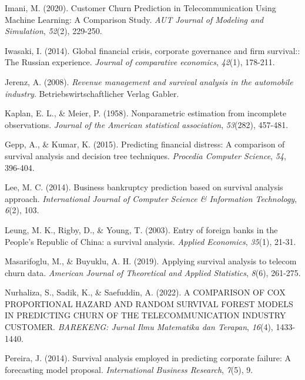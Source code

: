 \documentclass[doublespacing,12pt]{report}
\begin{document}
{\begin{enumerate}[label=\textbf{[\arabic*]}]
    \item Imani, M. (2020). Customer Churn Prediction in Telecommunication Using Machine Learning: A Comparison Study. \textit{AUT Journal of Modeling and Simulation}, \textit{52}(2), 229-250. 
    
    \item Iwasaki, I. (2014). Global financial crisis, corporate governance and firm survival:: The Russian experience. \textit{Journal of comparative economics}, \textit{42}(1), 178-211. 

    \item Jerenz, A. (2008). \textit{Revenue management and survival analysis in the automobile industry}. Betriebswirtschaftlicher Verlag Gabler. 
    
    \item Kaplan, E. L., \& Meier, P. (1958). Nonparametric estimation from incomplete observations. \textit{Journal of the American statistical association}, \textit{53}(282), 457-481. 


    
    \item Gepp, A., \& Kumar, K. (2015). Predicting financial distress: A comparison of survival analysis and decision tree techniques. \textit{Procedia Computer Science}, \textit{54}, 396-404. 
    

    
    \item Lee, M. C. (2014). Business bankruptcy prediction based on survival analysis approach. \textit{International Journal of Computer Science \& Information Technology}, \textit{6}(2), 103. 
    \item Leung, M. K., Rigby, D., \& Young, T. (2003). Entry of foreign banks in the People's Republic of China: a survival analysis. \textit{Applied Economics}, \textit{35}(1), 21-31. 
    
    \item Masarifoglu, M., \& Buyuklu, A. H. (2019). Applying survival analysis to telecom churn data. \textit{American Journal of Theoretical and Applied Statistics}, \textit{8}(6), 261-275. 
    
    
    \item Nurhaliza, S., Sadik, K., \& Saefuddin, A. (2022). A COMPARISON OF COX PROPORTIONAL HAZARD AND RANDOM SURVIVAL FOREST MODELS IN PREDICTING CHURN OF THE TELECOMMUNICATION INDUSTRY CUSTOMER. \textit{BAREKENG: Jurnal Ilmu Matematika dan Terapan}, \textit{16}(4), 1433-1440.
    \item Pereira, J. (2014). Survival analysis employed in predicting corporate failure: A forecasting model proposal. \textit{International Business Research}, \textit{7}(5), 9. 
    

\end{enumerate}}
\end{document}

